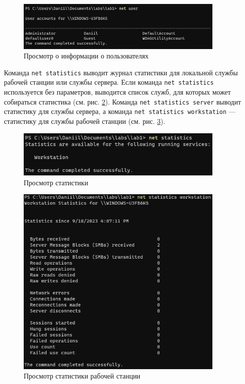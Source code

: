 \documentclass[a4paper, 14pt]{extarticle}
\begin{document}
\begin{figure}[H]
  \centering
  \includegraphics[width=0.9\textwidth]{images/net/user.png}
  \caption{Просмотр о информации о пользователях}
  \label{fig:net-user}
\end{figure}

Команда \texttt{net statistics} выводит журнал статистики для локальной службы
рабочей станции или службы сервера. Если команда \texttt{net statistics}
используется без параметров, выводится список служб, для которых может
собираться статистика (см. рис. \ref{fig:net-statistics}). Команда \texttt{net
  statistics server} выводит статистику для службы сервера, а команда
\texttt{net statistics workstation} --- статистику для службы рабочей станции
(см. рис. \ref{fig:net-statistics-workstation}).

\begin{figure}[H]
  \centering
  \includegraphics[width=0.9\textwidth]{images/net/statistics.png}
  \caption{Просмотр статистики}
  \label{fig:net-statistics}
\end{figure}

\begin{figure}[H]
  \centering
  \includegraphics[width=0.9\textwidth]{images/net/statistics-workstation.png}
  \caption{Просмотр статистики рабочей станции}
  \label{fig:net-statistics-workstation}
\end{figure}
\end{document}
